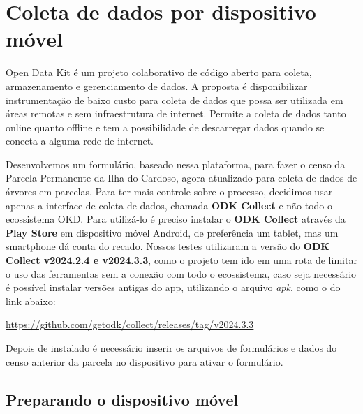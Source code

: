 \documentclass[12pt, a4paper]{article} %
\date{\today}
\title{}
\author{}
\begin{document}

\tableofcontents %
\newpage
{}



\section{Coleta de dados por dispositivo móvel}
\label{sec:coleta_de_dados_por_dispositivo_movel}


\href{https://opendatakit.org/}{Open Data Kit} é um projeto colaborativo de código aberto para coleta, armazenamento e gerenciamento de dados. A proposta é disponibilizar instrumentação de baixo custo para coleta de dados que possa ser utilizada em áreas remotas e sem infraestrutura de internet. Permite a coleta de dados tanto online quanto offline e tem a possibilidade de descarregar dados quando se conecta a alguma rede de internet.

Desenvolvemos um formulário, baseado nessa plataforma, para fazer o censo da Parcela Permanente da Ilha do Cardoso, agora atualizado para coleta de dados de árvores em parcelas. 
Para ter mais controle sobre o processo, decidimos usar apenas a interface de coleta de dados, chamada \textbf{ODK Collect} e não todo o ecossistema OKD. Para utilizá-lo é preciso instalar o \textbf{ODK Collect} através da \textbf{Play Store} em dispositivo móvel Android, de preferência um tablet, mas um smartphone dá conta do recado. Nossos testes utilizaram a versão do \textbf{ODK Collect v2024.2.4 e v2024.3.3}, como o projeto tem ido em uma rota de limitar o uso das ferramentas sem a conexão com todo o ecossistema, caso seja necessário é possível instalar versões antigas do app, utilizando o arquivo \textit{apk}, como o do link abaixo:

\url{https://github.com/getodk/collect/releases/tag/v2024.3.3}


Depois de instalado é necessário inserir os arquivos de formulários e dados do censo anterior da parcela no dispositivo para ativar o formulário.

\subsection{Preparando o dispositivo móvel}
\label{sec:preparando_o_dispositivo_movel}
\end{document}
